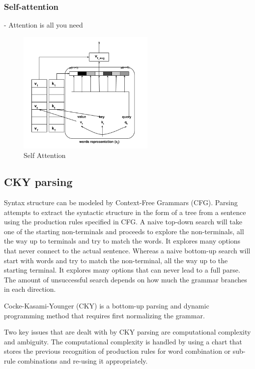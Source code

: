 \documentclass[a4paper, 11pt]{article}
\begin{document}
\subsubsection{Self-attention}

\parencite{Vaswani2017} - Attention is all you need

\begin{figure}[H]
    \centering
    \includegraphics[width=\textwidth,height=6cm,keepaspectratio=true]
    {self-attention.png}
    \caption{
        Self Attention
    }
    \label{fig:Self attention head}
\end{figure}


\subsection{CKY parsing}


Syntax structure can be modeled by Context-Free Grammars (CFG). Parsing attempts to extract the syntactic structure in the form of a tree from a sentence using the production rules specified in CFG.  A naive top-down search will take one of the starting non-terminals and proceeds to explore the non-terminals, all the way up to terminals and try to match the words. It explores many options that never connect to the actual sentence. Whereas a naive bottom-up search will start with words and try to match the non-terminal, all the way up to the starting terminal. It explores many options that can never lead to a full parse. The amount of unsuccessful search depends on how much the grammar branches in each direction.

Cocke-Kasami-Younger (CKY) \parencite{YOUNGER1967189} is a bottom-up parsing and dynamic programming method that requires first normalizing the grammar. 

Two key issues that are dealt with by CKY parsing are computational complexity and ambiguity. The computational complexity is handled by using a chart that stores the previous recognition of production rules for word combination or sub-rule combinations and re-using it appropriately. 
\end{document}
